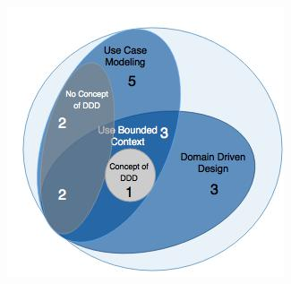 \begin{figure}[H]
\begin{center}
\includegraphics[scale=0.5]{figures/question3_2}
\label{fig:hybris_architecture/interview/question3-2}
\end{center}
\end{figure}
\\
